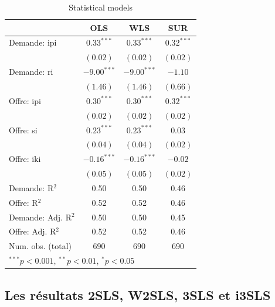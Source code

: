 \documentclass[11pt,]{article}
\begin{document}
\begin{table}[!htbp]
\begin{center}
\begin{tabular}{l c c c }
\hline
 & OLS & WLS & SUR \\
\hline
Demande: ipi        & $0.33^{***}$  & $0.33^{***}$  & $0.32^{***}$ \\
                    & $(0.02)$      & $(0.02)$      & $(0.02)$     \\
Demande: ri         & $-9.00^{***}$ & $-9.00^{***}$ & $-1.10$      \\
                    & $(1.46)$      & $(1.46)$      & $(0.66)$     \\
Offre: ipi          & $0.30^{***}$  & $0.30^{***}$  & $0.32^{***}$ \\
                    & $(0.02)$      & $(0.02)$      & $(0.02)$     \\
Offre: si           & $0.23^{***}$  & $0.23^{***}$  & $0.03$       \\
                    & $(0.04)$      & $(0.04)$      & $(0.02)$     \\
Offre: iki          & $-0.16^{***}$ & $-0.16^{***}$ & $-0.02$      \\
                    & $(0.05)$      & $(0.05)$      & $(0.02)$     \\
\hline
Demande: R$^2$      & 0.50          & 0.50          & 0.46         \\
Offre: R$^2$        & 0.52          & 0.52          & 0.46         \\
Demande: Adj. R$^2$ & 0.50          & 0.50          & 0.45         \\
Offre: Adj. R$^2$   & 0.52          & 0.52          & 0.46         \\
Num. obs. (total)   & 690           & 690           & 690          \\
\hline
\multicolumn{4}{l}{\scriptsize{$^{***}p<0.001$, $^{**}p<0.01$, $^*p<0.05$}}
\end{tabular}
\caption{Statistical models}
\label{table : ols, wls and sur}
\end{center}
\end{table}

\FloatBarrier

\hypertarget{les-resultats-2sls-w2sls-3sls-et-i3sls}{%
\subsection{Les résultats 2SLS, W2SLS, 3SLS et
i3SLS}\label{les-resultats-2sls-w2sls-3sls-et-i3sls}}
\end{document}
